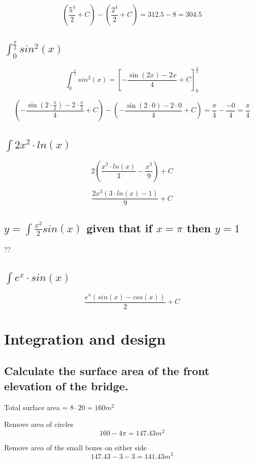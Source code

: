 \documentclass[12pt]{article}
\begin{document}
\[
\left(\frac{5^4}{2} + C\right) - \left(\frac{2^4}{2} + C\right) = 312.5 - 8 = 304.5
\]

\subsection{$\int_{0}^{\frac{\pi}{2}} sin^2(x)$}

\[
\int_{0}^{\frac{\pi}{2}} sin^2(x) = \left[-\frac{\sin\left(2x\right)-2x}{4} +C\right]_0^{\frac{\pi}{2}}
\]

\[
\left(-\frac{\sin\left(2 \cdot \frac{\pi}{2}\right)-2 \cdot \frac{\pi}{2}}{4} +C\right) - \left(-\frac{\sin\left(2 \cdot 0\right)-2 \cdot 0}{4} +C\right) = \frac{\pi}{4} - \frac{-0}{4} = \frac{\pi}{4}
\]

\subsection{$\int 2x^2 \cdot ln(x)$}

\[2\left(\frac{x^3 \cdot ln(x)}{3} - \frac{x^3}{9}\right) +C\]

\[\frac{2x^3 (3\cdot ln(x) - 1)}{9} + C\]

\subsection{$ y= \int \frac{x^2}{2}sin(x)$ given that if $x=\pi$ then $y=1$}

??

\subsection{$\int e^x \cdot sin(x)$}

\[\frac{e^x(sin(x) - cos(x))}{2} + C\]

\section{Integration and design}

\subsection{Calculate the surface area of the front elevation of the bridge.}

Total surface area = $8 \cdot 20 = 160m^2$

Remove area of circles
\[160 - 4\pi = 147.43m^2\]

Remove area of the small boxes on either side
\[147.43 - 3 - 3 = 141.43m^2\]
\end{document}
